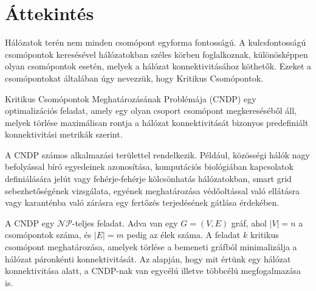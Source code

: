 \section{Áttekintés}\label{sec:ATTEKINTES}

Hálózatok terén nem minden csomópont egyforma fontosságú.
A kulcsfontosságú csomópontok keresésével hálózatokban széles körben foglalkoznak,
különösképpen olyan csomópontok esetén, melyek a hálózat konnektivitásához köthetők.
Ezeket a csomópontokat általában úgy nevezzük, hogy Kritikus Csomópontok.

Kritikus Csomópontok Meghatározásának Problémája (CNDP)
egy optimalizációs feladat, amely egy olyan csoport csomópont
megkereséséből áll, melyek törlése maximálisan rontja a hálózat
konnektivitását bizonyos predefiniált konnektivitási metrikák szerint.

A CNDP számos alkalmazási területtel rendelkezik.
Például, közösségi hálók nagy befolyással bíró egyedeinek azonosítása,
komputációs biológiában kapcsolatok definiálására jelút
vagy fehérje-fehérje kölcsönhatás hálózatokban,
smart grid sebezhetőségének vizsgálata, egyének meghatározása
védőoltással való ellátásra vagy karanténba való zárásra egy
fertőzés terjedésének gátlása érdekében.

A CNDP egy $\mathcal{N}\mathcal{P}$-teljes feladat. Adva van egy $G = (V, E)$ gráf, ahol $|V| = n$ a csomópontok száma,
és $|E| = m$ pedig az élek száma. A feladat $k$ kritikus csomópont meghatározása, amelyek törlése a bemeneti
gráfból minimalizálja a hálózat páronkénti konnektivitását. Az alapján, hogy mit értünk egy hálózat
konnektivitása alatt, a CNDP-nak van egycélú illetve többcélú megfogalmazása is.
